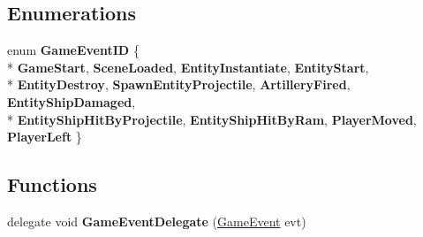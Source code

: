 \subsection*{Enumerations}
\begin{DoxyCompactItemize}
\item 
enum {\bfseries Game\-Event\-I\-D} \{ \\*
{\bfseries Game\-Start}, 
{\bfseries Scene\-Loaded}, 
{\bfseries Entity\-Instantiate}, 
{\bfseries Entity\-Start}, 
\\*
{\bfseries Entity\-Destroy}, 
{\bfseries Spawn\-Entity\-Projectile}, 
{\bfseries Artillery\-Fired}, 
{\bfseries Entity\-Ship\-Damaged}, 
\\*
{\bfseries Entity\-Ship\-Hit\-By\-Projectile}, 
{\bfseries Entity\-Ship\-Hit\-By\-Ram}, 
{\bfseries Player\-Moved}, 
{\bfseries Player\-Left}
 \}
\end{DoxyCompactItemize}
\subsection*{Functions}
\begin{DoxyCompactItemize}
\item 
\hypertarget{namespace_skyrates_1_1_client_1_1_game_1_1_event_a448e5d409dc993bd700f2f7f8161adf7}{delegate void {\bfseries Game\-Event\-Delegate} (\hyperlink{class_skyrates_1_1_client_1_1_game_1_1_event_1_1_game_event}{Game\-Event} evt)}\label{namespace_skyrates_1_1_client_1_1_game_1_1_event_a448e5d409dc993bd700f2f7f8161adf7}

\end{DoxyCompactItemize}
